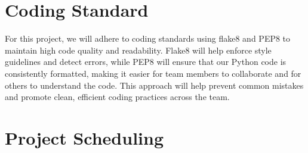 \documentclass{article}
\begin{document}
\section{Coding Standard}
For this project, we will adhere to coding standards using flake8 and PEP8 to 
maintain high code quality and readability. Flake8 will help enforce style 
guidelines and detect errors, while PEP8 will ensure that our Python code is 
consistently formatted, making it easier for team members to collaborate and 
for others to understand the code. This approach will help prevent common 
mistakes and promote clean, efficient coding practices across the team.

\section{Project Scheduling}

\end{document}
